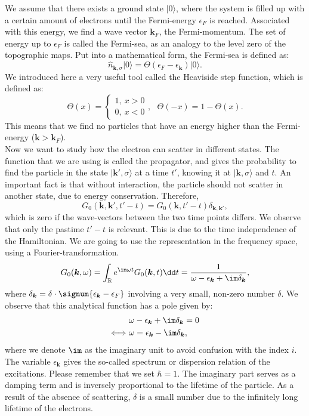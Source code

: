 \documentclass[../main.tex]{subfile}
\begin{document}
We assume that there exists a ground state $|0\rangle$, where the system is filled up with a certain amount of electrons until the Fermi-energy $\epsilon_F$ is reached.
 Associated with this
energy, we find a wave vector $\bm{k}_F$, the Fermi-momentum. The set of energy up to $\epsilon_F$ is called the Fermi-sea, as an analogy to the level zero of the topographic maps. 
Put into a mathematical form, the Fermi-sea is defined as:
\begin{equation}
    \hat{n}_{\bm{k},\sigma} |0\rangle = \Theta(\epsilon_F - \epsilon_{\bm{k}})|0\rangle.\label{eq:MomentumDistributionFree}
\end{equation}
We introduced here a very useful tool called the Heaviside step function, which is defined as: 
\begin{equation}\label{eq:Heaviside}
    \Theta(x) = \begin{cases}
        1, ~x > 0\\
        0, ~x < 0
    \end{cases} , ~~~ \Theta(-x) = 1 - \Theta(x).
\end{equation}
This means that we find no particles that have an energy higher than the Fermi-energy ($\bm{k}>\bm{k}_F$).\\

Now we want to study how the electron can scatter in different states. The function that we are using is called the propagator, and
gives the probability to find the particle in the state $|\bm{k}',\sigma\rangle$ at a time $t'$, knowing it at $|\bm{k},\sigma\rangle$ and $t$. 
An important fact is that without interaction, the particle should not scatter in another state, due to energy conservation. Therefore,
\[
    G_0(\bm{k}, \bm{k}', t'-t) = G_0(\bm{k}, t'-t) \delta_{\bm{k}, \bm{k}'},
\]
which is zero if the wave-vectors between the two time points differs. 
We observe that only the pastime $t'-t$ is relevant. This is due to the time independence of the Hamiltonian.
We are going to use the representation in the frequency space, using a Fourier-transformation.
\begin{equation}
    G_0(\bm{k},\omega) = \int_{\mathbb{R}} e^{\im\omega t} G_0(\bm{k},t)\dd t = \frac{1}{\omega - \epsilon_{\bm{k}} + \im \delta_{\bm{k}}}, \label{eq:single_propa}
\end{equation}
where $\delta_{\bm{k}} = \delta \cdot\signum{\epsilon_{\bm{k}} - \epsilon_{F}}$ involving a very small, non-zero number $\delta$. We observe that
this analytical function has a pole given by:
\begin{align*}
    &\omega - \epsilon_{\bm{k}} + \im \delta_{\bm{k}} = 0\\
    \Longleftrightarrow ~& \omega = \epsilon_{\bm{k}} - \im \delta_{\bm{k}},
\end{align*}
where we denote $\im$ as the imaginary unit to avoid confusion with the index $i$.
The variable $\epsilon_{\bm{k}}$ gives the so-called spectrum or dispersion relation of the excitations.  Please remember that we set $\hbar =1$. The imaginary part serves as a damping term and is 
inversely proportional to the lifetime of the particle. As a result of the absence of scattering, $\delta$ is a small number due to the infinitely long lifetime of the electrons.\\
\end{document}
